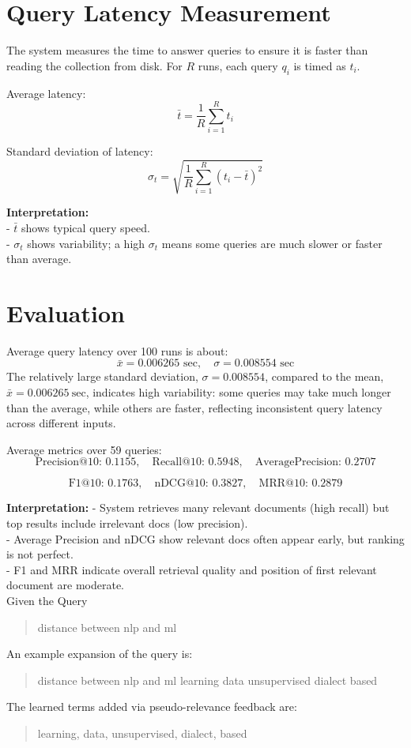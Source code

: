 \documentclass[a4paper,12pt]{article}
\begin{document}
\section{Query Latency Measurement}
The system measures the time to answer queries to ensure it is faster than reading the collection from disk.  
For $R$ runs, each query $q_i$ is timed as $t_i$.  

Average latency:
\[
\bar{t} = \frac{1}{R} \sum_{i=1}^{R} t_i
\]

Standard deviation of latency:
\[
\sigma_t = \sqrt{\frac{1}{R} \sum_{i=1}^{R} (t_i - \bar{t})^2}
\]

\textbf{Interpretation:}  \\
- $\bar{t}$ shows typical query speed.  \\
- $\sigma_t$ shows variability; a high $\sigma_t$ means some queries are much slower or faster than average. \\

\section{Evaluation}
Average query latency over 100 runs is about: 
\[ \bar{x} = 0.006265 \text{ sec},
 \quad \sigma = 0.008554 \text{ sec} 
 \] 
The relatively large standard deviation, \(\sigma = 0.008554\), compared to the mean, \(\bar{x} = 0.006265\ \text{sec}\), indicates high variability: some queries may take much longer than the average, while others are faster, reflecting inconsistent query latency across different inputs.


Average metrics over 59 queries:
\[
\text{Precision@10: } 0.1155, \quad
\text{Recall@10: } 0.5948, \quad
\text{AveragePrecision: } 0.2707
\]

\[
\text{F1@10: } 0.1763, \quad
\text{nDCG@10: } 0.3827, \quad
\text{MRR@10: } 0.2879
\]

\textbf{Interpretation:}  
- System retrieves many relevant documents (high recall) but top results include irrelevant docs (low precision).  \\
- Average Precision and nDCG show relevant docs often appear early, but ranking is not perfect.  \\
- F1 and MRR indicate overall retrieval quality and position of first relevant document are moderate. \\


Given the Query
 \begin{quote}
  distance between nlp and ml 
  \end{quote} 
  An example expansion of the query is: 
  \begin{quote} 
  distance between nlp and ml learning data unsupervised dialect based 
  \end{quote} 
  The learned terms added via pseudo-relevance feedback are: 
  \begin{quote} learning, data, unsupervised, dialect, based 
  \end{quote} 
\end{document}
